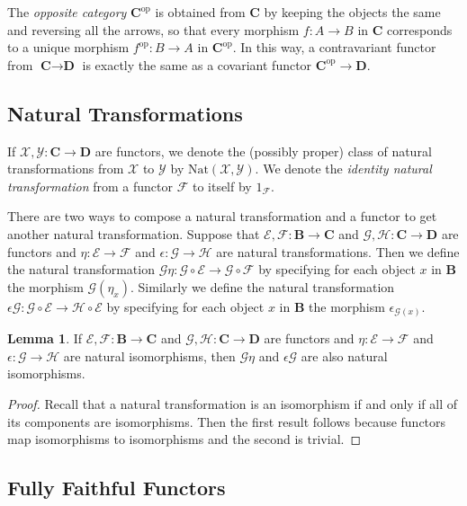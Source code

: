 \documentclass[oneside,11pt]{amsart}
\newcommand{\bB}{\ensuremath{\textbf{B}}}
\newcommand{\bC}{\ensuremath{\textbf{C}}}
\newcommand{\bD}{\ensuremath{\textbf{D}}}
\newcommand{\mX}{\ensuremath{\mathcal{X}}}
\newcommand{\mY}{\ensuremath{\mathcal{Y}}}
\newcommand{\mF}{\ensuremath{\mathcal{F}}}
\newcommand{\mG}{\ensuremath{\mathcal{G}}}
\newcommand{\mE}{\ensuremath{\mathcal{E}}}
\newcommand{\mH}{\ensuremath{\mathcal{H}}}
\newcommand{\Nat}{\ensuremath{\text{Nat}}}
\newcommand{\op}{\ensuremath{\text{op}}}
\theoremstyle{definition}
\newtheorem{proof techniques}{Proof Techniques}
\newtheorem{lemma}{Lemma}
\begin{document}
The \emph{opposite category} $\bC^\op$ is obtained from $\bC$ by keeping the objects the same and reversing all the arrows, so that every morphism $f : A \to B$ in $\bC$ corresponds to a unique morphism $f^\op : B \to A$ in $\bC^\op$. In this way, a contravariant functor from $\bC \to \bD$ is exactly the same as a covariant functor $\bC^\op \to \bD$. 


\subsection{Natural Transformations}

If $\mX , \mY : \bC \to \bD$ are functors, we denote the (possibly proper) class of natural transformations from $\mX$ to $\mY$ by $\Nat(\mX , \mY)$. We denote the \emph{identity natural transformation} from a functor $\mF$ to itself by $1_\mF$. 

There are two ways to compose a natural transformation and a functor to get another natural transformation. Suppose that $\mE , \mF : \bB \to \bC$ and $\mG,\mH : \bC \to  \bD$ are functors and $\eta : \mE \to \mF$ and $\epsilon : \mG \to \mH$ are natural transformations. Then we define the natural transformation $\mG \eta : \mG \circ \mE \to \mG \circ \mF$ by specifying for each object $x$ in $\bB$ the morphism $\mG(\eta_x)$. Similarly we define the natural transformation $\epsilon \mG : \mG \circ \mE \to \mH \circ \mE$ by specifying for each object $x$ in $\bB$ the morphism $\epsilon_{\mG(x)}$.

\begin{lemma}\label{lem: precomposition of a natural isomorphism with a functor}
If $\mE , \mF : \bB \to \bC$ and $\mG,\mH : \bC \to  \bD$ are functors and $\eta : \mE \to \mF$ and $\epsilon : \mG \to \mH$ are natural isomorphisms, then $\mG \eta$ and $\epsilon \mG$ are also natural isomorphisms.
\end{lemma}

\begin{proof}
Recall that a natural transformation is an isomorphism if and only if all of its components are isomorphisms. Then the first result follows because functors map isomorphisms to isomorphisms and the second is trivial. 
\end{proof}


\subsection{Fully Faithful Functors}
\end{document}
